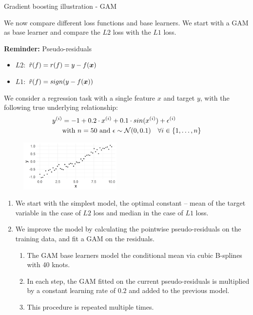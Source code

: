 \begin{vbframe}{Gradient boosting illustration - GAM}

We now compare different loss functions and base learners.
We start with a GAM as base learner and compare the $L2$ loss with
the $L1$ loss.\\
\vspace*{0.1cm}

\textbf{Reminder:} Pseudo-residuals
\begin{itemize}
\item $L2$: $\tilde{r}(f) = r(f) = y - f(\bm{x})$
\item $L1$: $\tilde{r}(f) = sign(y - f(\bm{x}))$
\end{itemize}
We consider a regression task with a single feature $x$ and target $y$, with 
the following true underlying relationship:
\vspace{-0.2cm}
\begin{align*}
y^{(i)} &=  -1 + 0.2 \cdot x^{(i)} + 0.1 \cdot sin(x^{(i)}) + \epsilon^{(i)} \\
&\text{with } n = 50 \text{ and } \epsilon \sim \mathcal{N}(0, 0.1) \quad 
\forall i \in \{1, \ldots, n\}
\end{align*}

\vfill

\begin{figure}
  \includegraphics[width = 0.45\textwidth]{figure/illustration_data_normal.png}
\end{figure}

\framebreak


\begin{enumerate}
  \item We start with the simplest model, the optimal constant -- mean of the 
  target variable in the case of $L2$ loss and median in the case of $L1$ loss.
  \item We improve the model by calculating the pointwise 
  pseudo-residuals on the training data, and fit a GAM on the residuals.
  \begin{enumerate}
    \item The GAM base learners model the conditional mean via cubic B-splines 
    with 40 knots. 
    \item In each step, the GAM fitted on the current pseudo-residuals is
    multiplied by a constant learning rate of $0.2$ and added to the previous
    model.
    \item This procedure is repeated multiple times.
  \end{enumerate}
\end{enumerate}

\end{vbframe}


